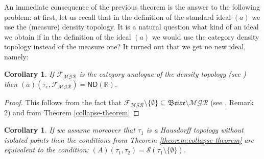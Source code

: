 \documentclass[12pt]{amsart}
\theoremstyle{plain}
\newtheorem{corollary}[theorem]{Corollary}
\theoremstyle{definition}
\theoremstyle{remark}
\newcommand{\Baire}{\mathfrak{Baire}}
\newcommand{\cl}{\mathit{cl}}
\newcommand{\meager}{{\mathcal{MGR}}}
\newcommand{\real}{\mathbb{R}}
\newcommand{\cF}{{\mathcal F}}
\newcommand{\cK}{{\mathcal K}}
\newcommand{\cS}{{\mathcal S}}
\newcommand{\mathint}{\mathit{int}}
\newcommand{\aideal}{\mathit{(a)}}
\newcommand{\Afield}{\mathit{(A)}}
\newcommand{\topWithoutEmptyset}[1]{#1\setminus\lbrace\emptyset\rbrace}
\begin{document}
An immediate consequence of the previous theorem is the answer to the following
problem: at first, let us recall that in the definition of the standard ideal $\aideal$
we use the (measure) density topology. It is a natural question what kind of an ideal
we obtain if in the definition of the ideal $\aideal$ we would use the category density topology
instead of the measure one? It turned out that we get no new ideal, namely:
\begin{corollary}
\label{corollary:category-density-topology}
If $\cF_{\meager}$ is the category analogue of the density topology (see \cite{PWBW}) 
then 
$(a)(\tau_e, \cF_{\meager}) = \mathsf{ND}(\real)$.
\end{corollary}

\begin{proof}
This follows from the fact that 
$\cF_{\meager} \setminus\lbrace\emptyset\rbrace\subseteq \Baire\setminus\meager$
(see \cite{PWBW}, Remark 2) and
from Theorem \ref{collapse-theorem}
\end{proof}

\begin{corollary}
If we assume moreover that $\tau_1$ is a Hausdorff topology without isolated points
then the conditions from Theorem \ref{theorem:collapse-theorem} are equivalent to
the condition: $\Afield(\tau_1, \tau_2) = \cS(\tau_1 \setminus \lbrace \emptyset \rbrace)$.
\end{corollary}
\end{document}
